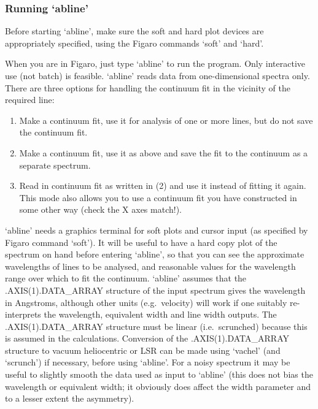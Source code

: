 \documentclass[11pt,twoside]{article}
\begin{document}

\subsubsection{\label{techno11running}Running `abline'}

   Before starting `abline', make sure the soft and hard plot devices
   are appropriately specified, using the Figaro commands `soft' and
   `hard'.

   When you are in Figaro, just type `abline' to run the program. Only
   interactive use (not batch) is feasible. `abline' reads data from
   one-dimensional spectra only. There are three options for handling
   the continuum fit in the vicinity of the required line:

\begin{enumerate}
\item
   Make a continuum fit, use it for analysis of one or more lines, but
   do not save the continuum fit.
\item
   Make a continuum fit, use it as above and save the fit to the
   continuum as a separate spectrum.
\item
   Read in continuum fit as written in (2) and use it instead of
   fitting it again. This mode also allows you to use a continuum fit
   you have constructed in some other way (check the X axes match!).
\end{enumerate}

   `abline' needs a graphics terminal for soft plots and cursor input
   (as specified by Figaro command `soft'). It will be useful to have a
   hard copy plot of the spectrum on hand before entering `abline', so
   that you can see the approximate wavelengths of lines to be analysed,
   and reasonable values for the wavelength range over which to fit the
   continuum. `abline' assumes that the .AXIS(1).DATA\_ARRAY structure of
   the input spectrum gives the wavelength in Angstroms, although other
   units (e.g.\ velocity) will work if one suitably re-interprets the
   wavelength, equivalent width and line width outputs. The
   .AXIS(1).DATA\_ARRAY structure must be linear (i.e.\ scrunched) because
   this is assumed in the calculations. Conversion of the
   .AXIS(1).DATA\_ARRAY structure to vacuum heliocentric or LSR can be
   made using `vachel' (and `scrunch') if necessary, before using
   `abline'. For a noisy spectrum it may be useful to slightly smooth
   the data used as input to `abline' (this does not bias the wavelength
   or equivalent width; it obviously does affect the width parameter and
   to a lesser extent the asymmetry).
\end{document}
